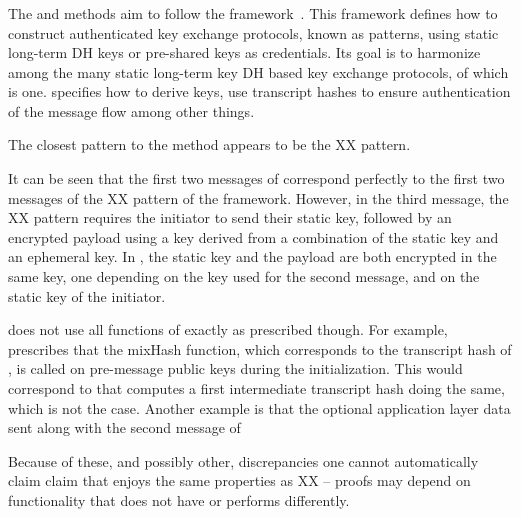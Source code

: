\spacehack
\subsubsection{\mNoise{}}
The \mStatStat{} and \mPskPsk{} methods aim to follow the \mNoise{}
framework~\cite{perrin2016noise}.
%
This framework defines how to construct authenticated key exchange protocols,
known as patterns, using static long-term DH keys or pre-shared
keys as credentials.
%
Its goal is to harmonize among the many static long-term key DH 
based key exchange protocols, of which \mOptls{} is one.
%
\mNoise{} specifies how to derive keys, use transcript hashes to ensure
authentication of the message flow among other things.
%

The closest \mNoise{} pattern to the \mStatStat{} method appears to be the
XX pattern.
%

{\color{blue}
It can be seen that the first two messages of \mStatStat{}
correspond perfectly to the first two messages of the XX pattern of
the \mNoise{} framework.
%
However, in the third message, the XX pattern requires
the initiator to send their static key, followed by an encrypted payload using a
key derived from a combination of the static key and an ephemeral key.
%
In \mEdhoc{}, the static key and the payload are both encrypted in the same key, one depending on the key used for the second message, and on the static key of the initiator.
}

\mEdhoc{} does not use all functions of \mNoise{} exactly as prescribed though.
%
For example, \mNoise{} prescribes that the mixHash function, which corresponds
to the transcript hash of \mEdhoc{}, is called on pre-message public keys
during the initialization.
%
This would correspond to that \mEdhoc{} computes a first intermediate transcript
hash doing the same, which is not the case.
%
Another example is that the optional application layer data sent along with
the second message of \mNoise{}

Because of these, and possibly other, discrepancies one cannot automatically
claim claim that \mEdhoc{} enjoys
the same properties as XX -- proofs may depend on functionality that \mEdhoc{}
does not have or performs differently.
%

